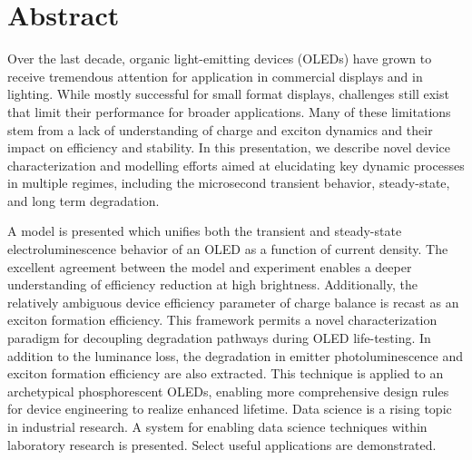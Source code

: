 \documentclass[../thesis.tex]{subfiles}
\begin{document}
\section*{Abstract}

Over the last decade, organic light-emitting devices (OLEDs) have grown to receive tremendous attention for application in commercial displays and in lighting.  While mostly successful for small format displays, challenges still exist that limit their performance for broader applications.  Many of these limitations stem from a lack of understanding of charge and exciton dynamics and their impact on efficiency and stability.  In this presentation, we describe novel device characterization and modelling efforts aimed at elucidating key dynamic processes in multiple regimes, including the microsecond transient behavior, steady-state, and long term degradation.  

A model is presented which unifies both the transient and steady-state electroluminescence behavior of an OLED as a function of current density.  The excellent agreement between the model and experiment enables a deeper understanding of efficiency reduction at high brightness.  Additionally, the relatively ambiguous device efficiency parameter of charge balance is recast as an exciton formation efficiency.  This framework permits a novel characterization paradigm for decoupling degradation pathways during OLED life-testing.  In addition to the luminance loss, the degradation in emitter photoluminescence and exciton formation efficiency are also extracted.  This technique is applied to an archetypical phosphorescent OLEDs, enabling more comprehensive design rules for device engineering to realize enhanced lifetime.  Data science is a rising topic in industrial research.  A system for enabling data science techniques within laboratory research is presented.  Select useful applications are demonstrated.

\pagebreak
\end{document}
